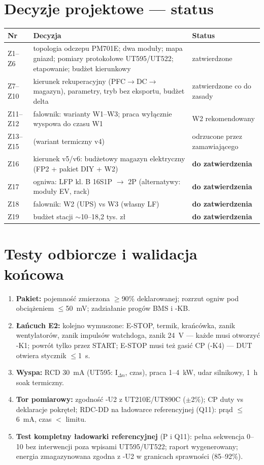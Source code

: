 \documentclass[11pt,a4paper]{article}
\begin{document}
\section{Decyzje projektowe --- status}
\begin{longtable}{@{}p{}p{}p{}@{}}
\toprule
\textbf{Nr} & \textbf{Decyzja} & \textbf{Status}\\
\midrule
Z1--Z6 & topologia odczepu PM701E; dwa moduły; mapa gniazd; pomiary protokołowe UT595/UT522;
etapowanie; budżet kierunkowy & zatwierdzone\\
Z7--Z10 & kierunek rekuperacyjny (PFC$\to$DC$\to$magazyn), parametry, tryb bez eksportu, budżet delta & zatwierdzone co do zasady\\
Z11--Z12 & falownik: warianty W1--W3; praca wyłącznie wyspowa do czasu W1 & W2 rekomendowany\\
Z13--Z15 & (wariant termiczny v4) & odrzucone przez zamawiającego\\
Z16 & kierunek v5/v6: budżetowy magazyn elektryczny (FP2 + pakiet DIY + W2) & \textbf{do zatwierdzenia}\\
Z17 & ogniwa: LFP kl. B 16S1P $\to$ 2P (alternatywy: moduły EV, rack) & \textbf{do zatwierdzenia}\\
Z18 & falownik: W2 (UPS) vs W3 (własny LF) & \textbf{do zatwierdzenia}\\
Z19 & budżet stacji $\sim$10--18,2 tys. zł & \textbf{do zatwierdzenia}\\
\bottomrule
\end{longtable}

\section{Testy odbiorcze i walidacja końcowa}
\begin{enumerate}
\item \textbf{Pakiet:} pojemność zmierzona $\ge$90\% deklarowanej; rozrzut ogniw pod obciążeniem
$\le$50~mV; zadziałanie progów BMS i -KB.
\item \textbf{Łańcuch E2:} kolejno wymuszone: E-STOP, termik, krańcówka, zanik wentylatorów,
zanik impulsów watchdoga, zanik 24~V --- każde musi otworzyć -K1; powrót tylko przez START;
E-STOP musi też gasić CP (-K4) --- DUT otwiera stycznik $\le$1~s.
\item \textbf{Wyspa:} RCD 30~mA (UT595: I$_{\Delta n}$, czas), praca 1--4~kW, udar silnikowy,
1~h soak termiczny.
\item \textbf{Tor pomiarowy:} zgodność -U2 z UT210E/UT890C ($\pm$2\%); CP duty vs deklaracje
pokręteł; RDC-DD na ładowarce referencyjnej (Q11): prąd $\le$6~mA, czas $<$ limitu.
\item \textbf{Test kompletny ładowarki referencyjnej} (P i Q11): pełna sekwencja 0--10 bez
interwencji poza wpisami UT595/UT522; raport wygenerowany; energia zmagazynowana zgodna z -U2
w granicach sprawności (85--92\%).
\end{enumerate}
\end{document}
